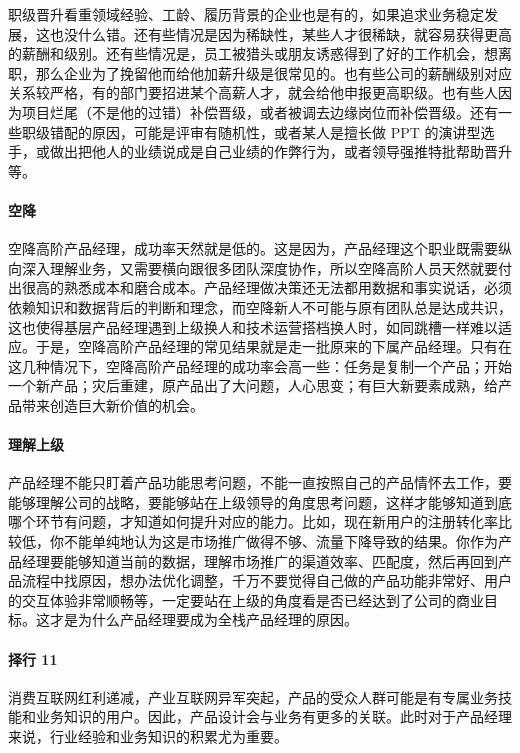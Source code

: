 \documentclass[letterpaper,11pt,english]{sphinxmanual}
\begin{document}
职级晋升看重领域经验、工龄、履历背景的企业也是有的，如果追求业务稳定发展，这也没什么错。还有些情况是因为稀缺性，某些人才很稀缺，就容易获得更高的薪酬和级别。还有些情况是，员工被猎头或朋友诱惑得到了好的工作机会，想离职，那么企业为了挽留他而给他加薪升级是很常见的。也有些公司的薪酬级别对应关系较严格，有的部门要招进某个高薪人才，就会给他申报更高职级。也有些人因为项目烂尾（不是他的过错）补偿晋级，或者被调去边缘岗位而补偿晋级。还有一些职级错配的原因，可能是评审有随机性，或者某人是擅长做
PPT
的演讲型选手，或做出把他人的业绩说成是自己业绩的作弊行为，或者领导强推特批帮助晋升等。


\paragraph{空降}
\label{\detokenize{chapter_experience/career_path:id20}}
空降高阶产品经理，成功率天然就是低的。这是因为，产品经理这个职业既需要纵向深入理解业务，又需要横向跟很多团队深度协作，所以空降高阶人员天然就要付出很高的熟悉成本和磨合成本。产品经理做决策还无法都用数据和事实说话，必须依赖知识和数据背后的判断和理念，而空降新人不可能与原有团队总是达成共识，这也使得基层产品经理遇到上级换人和技术运营搭档换人时，如同跳槽一样难以适应。于是，空降高阶产品经理的常见结果就是走一批原来的下属产品经理。只有在这几种情况下，空降高阶产品经理的成功率会高一些：任务是复制一个产品；开始一个新产品；灾后重建，原产品出了大问题，人心思变；有巨大新要素成熟，给产品带来创造巨大新价值的机会。


\paragraph{理解上级}
\label{\detokenize{chapter_experience/career_path:id21}}
产品经理不能只盯着产品功能思考问题，不能一直按照自己的产品情怀去工作，要能够理解公司的战略，要能够站在上级领导的角度思考问题，这样才能够知道到底哪个环节有问题，才知道如何提升对应的能力。比如，现在新用户的注册转化率比较低，你不能单纯地认为这是市场推广做得不够、流量下降导致的结果。你作为产品经理要能够知道当前的数据，理解市场推广的渠道效率、匹配度，然后再回到产品流程中找原因，想办法优化调整，千万不要觉得自己做的产品功能非常好、用户的交互体验非常顺畅等，一定要站在上级的角度看是否已经达到了公司的商业目标。这才是为什么产品经理要成为全栈产品经理的原因。


\paragraph{择行 11\sphinxfootnotemark[612]}
\label{\detokenize{chapter_experience/career_path:id22}}%
\begin{footnotetext}[612]\sphinxAtStartFootnote
{}
%
\end{footnotetext}\ignorespaces 
消费互联网红利递减，产业互联网异军突起，产品的受众人群可能是有专属业务技能和业务知识的用户。因此，产品设计会与业务有更多的关联。此时对于产品经理来说，行业经验和业务知识的积累尤为重要。
\end{document}
